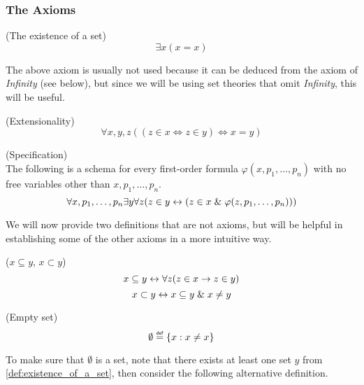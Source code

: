 \subsubsection{The Axioms}

\begin{definition}{(The existence of a set)}\label{def:existence_of_a_set}
\begin{equation}
\exists x (x = x)
\end{equation}
\end{definition}
The above axiom is usually not used because it can be deduced from the axiom of \emph{Infinity} (see below), but since we will be using set theories that omit \emph{Infinity}, this will be useful.

\begin{definition}{(Extensionality)}\label{def:extensionality}
\begin{equation}
\forall x, y, z ((z \in x \iff z \in y) \iff x = y)
\end{equation}
\end{definition}

\begin{definition}{(Specification)}\label{def:specification}\\
The following is a schema for every first-order formula $\varphi(x, p_1, \ldots, p_n)$ with no free variables other than $x, p_1, \ldots, p_n$.
\begin{equation}
\forall x, p_1, \ldots, p_n \exists y \forall z ( z \in y \leftrightarrow ( z \in x \mathrel{\&} \varphi(z, p_1, \ldots, p_n)))
\end{equation}
\end{definition}

We will now provide two definitions that are not axioms, but will be helpful in establishing some of the other axioms in a more intuitive way.
\begin{definition}{($x \subseteq y$, $x \subset y$)}
\begin{equation}
x \subseteq y \leftrightarrow \forall z(z \in x \rightarrow z \in y)
\end{equation}
\begin{equation}
x \subset y \leftrightarrow x \subseteq y \mathrel{\&} x \neq y
\end{equation}
\end{definition}

\begin{definition}{(Empty set)}\label{def:emptyset}
\begin{equation}
\emptyset \defeq \{x : x \neq x\}
\end{equation}
\end{definition}
To make sure that $\emptyset$ is a set, note that there exists at least one set $y$ from \ref{def:existence_of_a_set}, then consider the following alternative definition.

